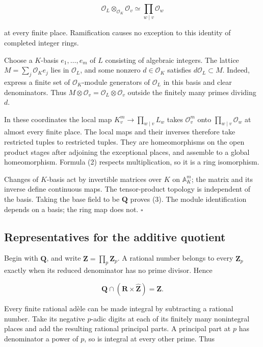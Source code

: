 \documentclass[
  english,
  11pt,
  a4paper,
]{article}
\begin{document}
\[\mathcal O_L\otimes_{\mathcal O_K}\mathcal O_v
\simeq\prod_{w\mid v}\mathcal O_w
\tag{6}\]

at every finite place. Ramification causes no exception to this identity
of completed integer rings.

Choose a \(K\)-basis \(e_1,\ldots,e_m\) of \(L\) consisting of algebraic
integers. The lattice \(M=\sum_j\mathcal O_K e_j\) lies in
\(\mathcal O_L\), and some nonzero \(d\in\mathcal O_K\) satisfies
\(d\mathcal O_L\subset M\). Indeed, express a finite set of
\(\mathcal O_K\)-module generators of \(\mathcal O_L\) in this basis and
clear denominators. Thus
\(M\otimes\mathcal O_v=\mathcal O_L\otimes\mathcal O_v\) outside the
finitely many primes dividing \(d\).

In these coordinates the local map \(K_v^m\to\prod_{w\mid v}L_w\) takes
\(\mathcal O_v^m\) onto \(\prod_{w\mid v}\mathcal O_w\) at almost every
finite place. The local maps and their inverses therefore take
restricted tuples to restricted tuples. They are homeomorphisms on the
open product stages after adjoining the exceptional places, and assemble
to a global homeomorphism. Formula (2) respects multiplication, so it is
a ring isomorphism.

Changes of \(K\)-basis act by invertible matrices over \(K\) on
\(\mathbb A_K^m\); the matrix and its inverse define continuous maps.
The tensor-product topology is independent of the basis. Taking the base
field to be \(\mathbf Q\) proves (3). The module identification depends
on a basis; the ring map does not. \(\square\)

\subsection{Representatives for the additive
quotient}\label{NT-ADL-02--representatives-for-the-additive-quotient}

Begin with \(\mathbf Q\), and write
\(\widehat{\mathbf Z}=\prod_p\mathbf Z_p\). A rational number belongs to
every \(\mathbf Z_p\) exactly when its reduced denominator has no prime
divisor. Hence

\[\mathbf Q\cap(\mathbf R\times\widehat{\mathbf Z})=\mathbf Z.
\tag{7}\]

Every finite rational adèle can be made integral by subtracting a
rational number. Take its negative \(p\)-adic digits at each of its
finitely many nonintegral places and add the resulting rational
principal parts. A principal part at \(p\) has denominator a power of
\(p\), so is integral at every other prime. Thus
\end{document}
